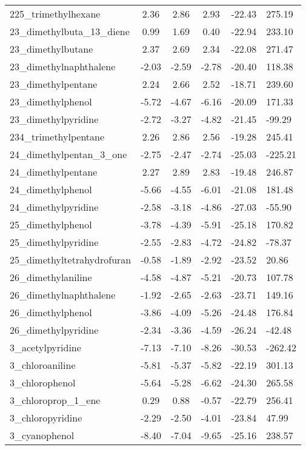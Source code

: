 \documentclass{amsart}
\begin{document}
\begin{longtable}{L|C|C|C|X|X}
225\_trimethylhexane & 2.36 & 2.86 & 2.93 & -22.43 & 275.19 \\ 
23\_dimethylbuta\_13\_diene & 0.99 & 1.69 & 0.40 & -22.94 & 233.10 \\ 
23\_dimethylbutane & 2.37 & 2.69 & 2.34 & -22.08 & 271.47 \\ 
23\_dimethylnaphthalene & -2.03 & -2.59 & -2.78 & -20.40 & 118.38 \\ 
23\_dimethylpentane & 2.24 & 2.66 & 2.52 & -18.71 & 239.60 \\ 
23\_dimethylphenol & -5.72 & -4.67 & -6.16 & -20.09 & 171.33 \\ 
23\_dimethylpyridine & -2.72 & -3.27 & -4.82 & -21.45 & -99.29 \\ 
234\_trimethylpentane & 2.26 & 2.86 & 2.56 & -19.28 & 245.41 \\ 
24\_dimethylpentan\_3\_one & -2.75 & -2.47 & -2.74 & -25.03 & -225.21 \\ 
24\_dimethylpentane & 2.27 & 2.89 & 2.83 & -19.48 & 246.87 \\ 
24\_dimethylphenol & -5.66 & -4.55 & -6.01 & -21.08 & 181.48 \\ 
24\_dimethylpyridine & -2.58 & -3.18 & -4.86 & -27.03 & -55.90 \\ 
25\_dimethylphenol & -3.78 & -4.39 & -5.91 & -25.18 & 170.82 \\ 
25\_dimethylpyridine & -2.55 & -2.83 & -4.72 & -24.82 & -78.37 \\ 
25\_dimethyltetrahydrofuran & -0.58 & -1.89 & -2.92 & -23.52 & 20.86 \\ 
26\_dimethylaniline & -4.58 & -4.87 & -5.21 & -20.73 & 107.78 \\ 
26\_dimethylnaphthalene & -1.92 & -2.65 & -2.63 & -23.71 & 149.16 \\ 
26\_dimethylphenol & -3.86 & -4.09 & -5.26 & -24.48 & 176.84 \\ 
26\_dimethylpyridine & -2.34 & -3.36 & -4.59 & -26.24 & -42.48 \\ 
3\_acetylpyridine & -7.13 & -7.10 & -8.26 & -30.53 & -262.42 \\ 
3\_chloroaniline & -5.81 & -5.37 & -5.82 & -22.19 & 301.13 \\ 
3\_chlorophenol & -5.64 & -5.28 & -6.62 & -24.30 & 265.58 \\ 
3\_chloroprop\_1\_ene & 0.29 & 0.88 & -0.57 & -22.79 & 256.41 \\ 
3\_chloropyridine & -2.29 & -2.50 & -4.01 & -23.84 & 47.99 \\ 
3\_cyanophenol & -8.40 & -7.04 & -9.65 & -25.16 & 238.57 \\ 

\end{longtable}
\end{document}
